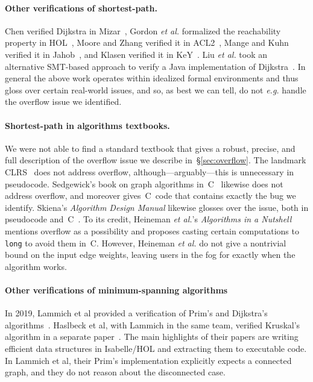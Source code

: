 \paragraph{Other verifications of shortest-path.}
Chen verified Dijkstra in Mizar~\cite{chen2003dijkstra}, Gordon \emph{et al.} formalized the reachability property in HOL~\cite{gordon2003executing}, Moore and Zhang verified it in ACL2~\cite{Moore2005}, Mange and Kuhn verified it in Jahob~\cite{mange2007verifying}, and Klasen verified it in KeY~\cite{klasen2010verifying}.  Liu \emph{et al.} took an alternative SMT-based approach to verify a Java implementation of Dijkstra~\cite{6200101}.  In general the above work operates within
idealized formal environments and thus gloss over certain real-world issues, and so, as best we
can tell, do not \emph{e.g.} handle the overflow issue we identified.



\paragraph{Shortest-path in algorithms textbooks.}
We were not able to find a standard textbook that gives a robust, precise,
and full description of the overflow issue we describe in~\S\ref{sec:overflow}.
The landmark CLRS~\cite{clrs} does not address overflow, although---arguably---this is unnecessary in pseudocode.  Sedgewick's book on graph algorithms in~C~\cite{sedgewick} likewise does not address overflow, and moreover gives~C~code
that contains exactly the bug we identify.  Skiena's \emph{Algorithm Design Manual} likewise
glosses over the issue, both
in pseudocode and~C~\cite{DBLP:books/daglib/0022194}.
To its credit, Heineman \emph{et al.}'s \emph{Algorithms in a Nutshell}~\cite{heineman2008algorithms} mentions overflow as a possibility and
proposes casting certain computations to \texttt{long} to avoid them in~C.  However, Heineman
\emph{et al.} do not give a
nontrivial bound on the input edge weights, leaving users in the fog for exactly when the algorithm works.

\paragraph{Other verifications of minimum-spanning algorithms}In 2019, Lammich et al provided a verification of Prim's and Dijkstra's algorithms~\cite{DBLP:journals/afp/LammichN19}. Haslbeck et al, with Lammich in the same team, verified Kruskal's algorithm in a separate paper~\cite{DBLP:journals/afp/HaslbeckLB19}. The main highlights of their papers are writing efficient data structures in Isabelle/HOL and extracting them to executable code. In Lammich et al, their Prim's implementation explicitly expects a connected graph, and they do not reason about the disconnected case.

